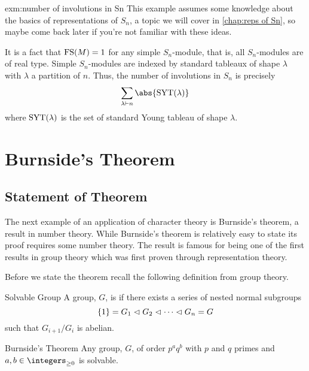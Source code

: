 \begin{exm}{}{exm:number of involutions in Sn}
    This example assumes some knowledge about the basics of representations of \(S_n\), a topic we will cover in \cref{chap:reps of Sn}, so maybe come back later if you're not familiar with these ideas.
    
    It is a fact that \(\operatorname{FS}(M) = 1\) for any simple \(S_n\)-module, that is, all \(S_n\)-modules are of real type.
    Simple \(S_n\)-modules are indexed by standard tableaux of shape \(\lambda\) with \(\lambda\) a partition of \(n\).
    Thus, the number of involutions in \(S_n\) is precisely
    \begin{equation}
        \sum_{\lambda \partition n} \abs{\standardYoungTableaux(\lambda)}
    \end{equation}
    where \(\operatorname{SYT}(\lambda)\) is the set of standard Young tableau of shape \(\lambda\).
\end{exm}

\section{Burnside's Theorem}
\subsection{Statement of Theorem}
The next example of an application of character theory is Burnside's theorem, a result in number theory.
While Burnside's theorem is relatively easy to state its proof requires some number theory.
The result is famous for being one of the first results in group theory which was first proven through representation theory.

Before we state the theorem recall the following definition from group theory.
\begin{dfn}{Solvable Group}{}
    A group, \(G\), is  if there exists a series of nested normal subgroups
    \begin{equation}
        \{1\} = G_1 \mathrel{\lhd} G_2 \mathrel{\lhd} \dotsb \mathrel{\lhd} G_n = G
    \end{equation}
    such that \(G_{i+1}/G_i\) is abelian.
\end{dfn}

\begin{thm*}{Burnside's Theorem}{}
    Any group, \(G\), of order \(p^aq^b\) with \(p\) and \(q\) primes and \(a, b \in \integers_{\ge 0}\) is solvable.
\end{thm*}

